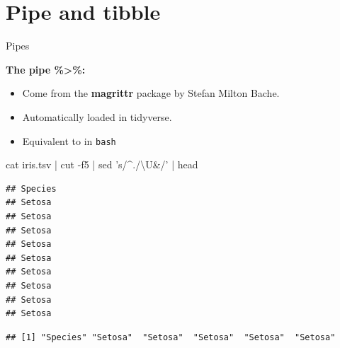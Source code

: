 \documentclass[14pt,ignorenonframetext,]{bredelebeamer}
\newenvironment{Shaded}{\begin{snugshade}}{\end{snugshade}}
\newcommand{\KeywordTok}[1]{\textcolor[rgb]{0.94,0.87,0.69}{#1}}
\newcommand{\DataTypeTok}[1]{\textcolor[rgb]{0.87,0.87,0.75}{#1}}
\newcommand{\DecValTok}[1]{\textcolor[rgb]{0.86,0.86,0.80}{#1}}
\newcommand{\StringTok}[1]{\textcolor[rgb]{0.80,0.58,0.58}{#1}}
\newcommand{\FunctionTok}[1]{\textcolor[rgb]{0.94,0.94,0.56}{#1}}
\newcommand{\OperatorTok}[1]{\textcolor[rgb]{0.94,0.94,0.82}{#1}}
\newcommand{\NormalTok}[1]{\textcolor[rgb]{0.80,0.80,0.80}{#1}}
\providecommand{\tightlist}{%
  \setlength{\itemsep}{0pt}\setlength{\parskip}{0pt}}
\begin{document}
\section{Pipe and tibble}\label{pipe-and-tibble}

\begin{frame}[fragile]{Pipes}

\textbf{The pipe \%\textgreater{}\%:}

\begin{itemize}
\tightlist
\item
  Come from the \textbf{magrittr} package by Stefan Milton Bache.
\item
  Automatically loaded in tidyverse.
\item
  Equivalent to \texttt{\textbar{}} in \texttt{bash}
\end{itemize}

\begin{Shaded}
\begin{Highlighting}[]
\FunctionTok{cat}\NormalTok{ iris.tsv }\KeywordTok{|} \FunctionTok{cut}\NormalTok{ -f5 }\KeywordTok{|} \FunctionTok{sed} \StringTok{'s/^./\textbackslash{}U&/'} \KeywordTok{|} \FunctionTok{head}
\end{Highlighting}
\end{Shaded}

\begin{verbatim}
## Species
## Setosa
## Setosa
## Setosa
## Setosa
## Setosa
## Setosa
## Setosa
## Setosa
## Setosa
\end{verbatim}

\begin{Shaded}
\end{Shaded}

\begin{verbatim}
## [1] "Species" "Setosa"  "Setosa"  "Setosa"  "Setosa"  "Setosa"
\end{verbatim}

\end{frame}
\end{document}
